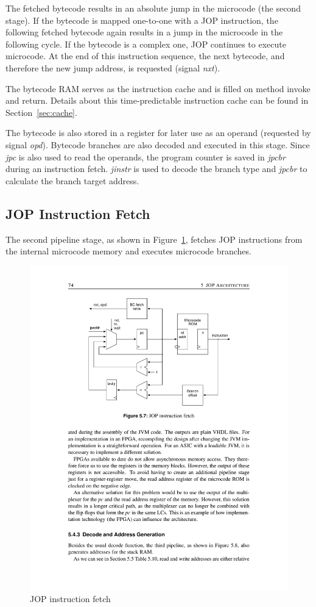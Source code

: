 The fetched bytecode results in an absolute jump in the microcode
(the second stage). If the bytecode is mapped one-to-one with a JOP
instruction, the following fetched bytecode again results in a jump
in the microcode in the following cycle. If the bytecode is a complex
one, JOP continues to execute microcode. At the end of this
instruction sequence, the next bytecode, and therefore the new jump
address, is requested (signal \emph{nxt}).

The bytecode RAM serves as the instruction cache and is filled on
method invoke and return. Details about this time-predictable
instruction cache can be found in Section~\ref{sec:cache}.

The bytecode is also stored in a register for later use as an
operand (requested by signal \emph{opd}). Bytecode branches are also
decoded and executed in this stage. Since \emph{jpc} is also used to
read the operands, the program counter is saved in \emph{jpcbr}
during an instruction fetch. \emph{jinstr} is used to decode the
branch type and \emph{jpcbr} to calculate the branch target address.

\subsection{JOP Instruction Fetch}

The second pipeline stage, as shown in Figure~\ref{fig_arch_fetch},
fetches JOP instructions from the internal microcode memory and
executes microcode branches.

\begin{figure}
    \centering
    \includegraphics[scale=\picscale]{arch/arch_fetch}
    \caption{JOP instruction fetch}
    \label{fig_arch_fetch}
\end{figure}

